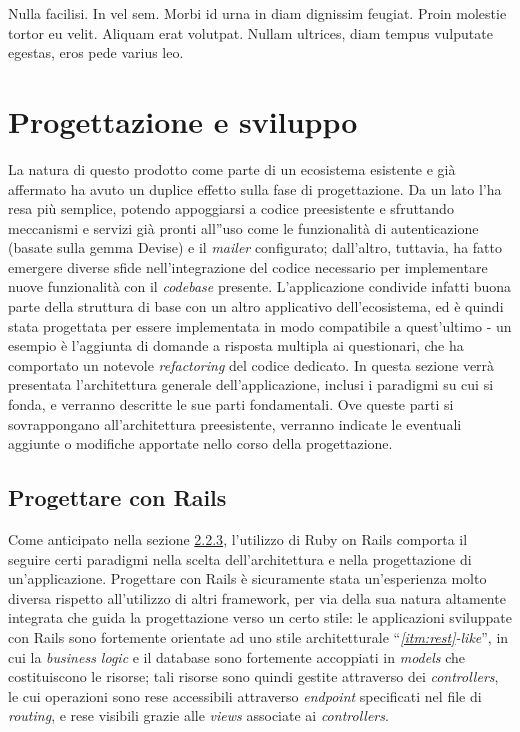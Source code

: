 

\begin{savequote}[75mm]
Nulla facilisi. In vel sem. Morbi id urna in diam dignissim feugiat. Proin molestie tortor eu velit. Aliquam erat volutpat. Nullam ultrices, diam tempus vulputate egestas, eros pede varius leo.
\end{savequote}

\chapter{Progettazione e sviluppo}
\label{chap4}
La natura di questo prodotto come parte di un ecosistema esistente e già affermato ha avuto un duplice effetto sulla fase di progettazione. Da un lato l'ha resa più semplice, potendo appoggiarsi a codice preesistente e sfruttando meccanismi e servizi già pronti all''uso come le funzionalità di autenticazione (basate sulla gemma Devise) e il \textit{mailer} configurato; dall'altro, tuttavia, ha fatto emergere diverse sfide nell'integrazione del codice necessario per implementare nuove funzionalità con il \textit{codebase} presente. L'applicazione condivide infatti buona parte della struttura di base con un altro applicativo dell'ecosistema, ed è quindi stata progettata per essere implementata in modo compatibile a quest'ultimo - un esempio è l'aggiunta di domande a risposta multipla ai questionari, che ha comportato un notevole \textit{refactoring} del codice dedicato.
In questa sezione verrà presentata l'architettura generale dell'applicazione, inclusi i paradigmi su cui si fonda, e verranno descritte le sue parti fondamentali. Ove queste parti si sovrappongano all'architettura preesistente, verranno indicate le eventuali aggiunte o modifiche apportate nello corso della progettazione.

\section{Progettare con Rails}
Come anticipato nella sezione \hyperref[sec:2.2.3]{2.2.3}, l'utilizzo di Ruby on Rails comporta il seguire certi paradigmi nella scelta dell'architettura e nella progettazione di un'applicazione. Progettare con Rails è sicuramente stata un'esperienza molto diversa rispetto all'utilizzo di altri framework, per via della sua natura altamente integrata che guida la progettazione verso un certo stile: le applicazioni sviluppate con Rails sono fortemente orientate ad uno stile architetturale ``\textit{\ref{itm:rest}-like}'', in cui la \textit{business logic} e il database sono fortemente accoppiati in \textit{models} che costituiscono le risorse; tali risorse sono quindi gestite attraverso dei \textit{controllers}, le cui operazioni sono rese accessibili attraverso \textit{endpoint} specificati nel file di \textit{routing}, e rese visibili grazie alle \textit{views} associate ai \textit{controllers}.

